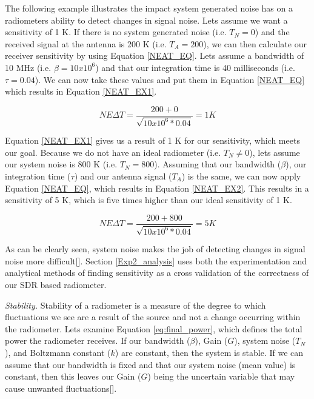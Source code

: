 The following example illustrates the impact system generated noise has on a radiometers ability to detect changes in signal noise.  Lets assume we want a sensitivity of 1 K.  If there is no system generated noise (i.e. $T_N = 0$) and the received signal at the antenna is 200 K (i.e. $T_A = 200$), we can then calculate our receiver sensitivity by using Equation \ref{NEAT_EQ}.  Lets assume a bandwidth of 10 MHz (i.e. $\beta = 10 x 10^6$) and that our integration time is 40 milliseconds (i.e. $\tau = 0.04$).  We can now take these values and put them in Equation \ref{NEAT_EQ} which results in Equation \ref{NEAT_EX1}.

\begin{equation} \label{NEAT_EX1}
NE\Delta T=\frac{200 + 0}{\sqrt{10 x 10^6 * 0.04}} = 1 K 
\end{equation}

Equation \ref{NEAT_EX1} gives us a result of 1 K for our sensitivity, which meets our goal.  Because we do not have an ideal radiometer (i.e. $T_N \neq 0$), lets assume our system noise is 800 K (i.e. $T_N = 800$).  Assuming that our bandwidth ($\beta$), our integration time ($\tau$) and our antenna signal ($T_A$) is the same, we can now apply Equation \ref{NEAT_EQ}, which results in Equation \ref{NEAT_EX2}.  This results in a sensitivity of 5 K, which is five times higher than our ideal sensitivity of 1 K. 

\begin{equation} \label{NEAT_EX2}
NE\Delta T=\frac{200 + 800}{\sqrt{10 x 10^6 * 0.04}} = 5 K 
\end{equation}

As can be clearly seen, system noise makes the job of detecting changes in signal noise more difficult[\cite{skou}].  Section \ref{Exp2_analysis} uses both the experimentation and analytical methods of finding sensitivity as a cross validation of the correctness of our SDR based radiometer.

\emph{Stability.}  Stability of a radiometer is a measure of the degree to which fluctuations we see are a result of the source and not a change occurring within the radiometer.  Lets examine Equation \ref{eq:final_power}, which defines the total power the radiometer receives.  If our bandwidth ($\beta$), Gain ($G$), system noise ($T_N$), and Boltzmann constant ($k$) are constant, then the system is stable.  If we can assume that our bandwidth is fixed and that our system noise (mean value) is constant, then this leaves our Gain ($G$) being the uncertain variable that may cause unwanted fluctuations[\cite{Evans}]. 

